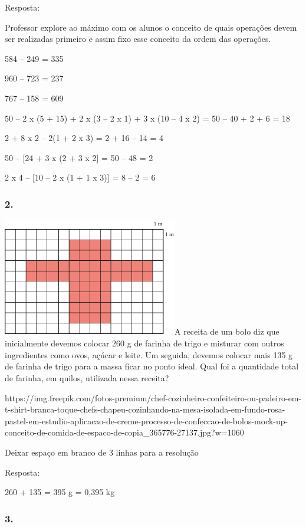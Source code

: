 Resposta:

Professor explore ao máximo com os alunos o conceito de quais operações
devem ser realizadas primeiro e assim fixo esse conceito da ordem das
operações.

584 -- 249 = 335

960 -- 723 = 237

767 -- 158 = 609

50 -- 2 x (5 + 15) + 2 x (3 -- 2 x 1) + 3 x (10 -- 4 x 2) = 50 -- 40 + 2
+ 6 = 18

2 + 8 x 2 -- 2(1 + 2 x 3) = 2 + 16 -- 14 = 4

50 -- {[}24 + 3 x (2 + 3 x 2{]} = 50 -- 48 = 2

2 x 4 -- {[}10 -- 2 x (1 + 1 x 3){]} = 8 -- 2 = 6

\subsubsection{2.}\label{section-14}

\includegraphics[width=3.00000in,height=2.02528in]{media/image32.png}A
receita de um bolo diz que inicialmente devemos colocar 260 g de farinha
de trigo e misturar com outros ingredientes como ovos, açúcar e leite.
Um seguida, devemos colocar mais 135 g de farinha de trigo para a massa
ficar no ponto ideal. Qual foi a quantidade total de farinha, em quilos,
utilizada nessa receita?

https://img.freepik.com/fotos-premium/chef-cozinheiro-confeiteiro-ou-padeiro-em-t-shirt-branca-toque-chefs-chapeu-cozinhando-na-mesa-isolada-em-fundo-rosa-pastel-em-estudio-aplicacao-de-creme-processo-de-confeccao-de-bolos-mock-up-conceito-de-comida-de-espaco-de-copia\_365776-27137.jpg?w=1060

Deixar espaço em branco de 3 linhas para a resolução

Resposta:

260 + 135 = 395 g = 0,395 kg

\subsubsection{3.}\label{section-15}

